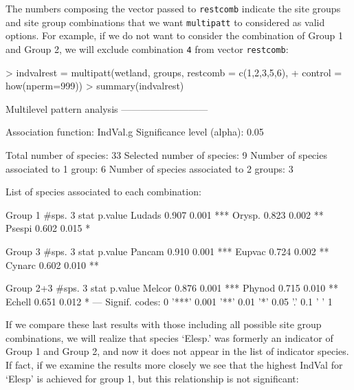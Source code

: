 \documentclass[11pt,a4paper]{article}
\begin{document}
The numbers composing the vector passed to \texttt{restcomb} indicate the site groups and site group combinations that we want \texttt{multipatt} to considered as valid options. For example, if we do not want to consider the combination of Group 1 and Group 2, we will exclude combination \texttt{4} from vector \texttt{restcomb}:
\begin{Schunk}
\begin{Sinput}
> indvalrest = multipatt(wetland, groups, restcomb = c(1,2,3,5,6), 
+                        control = how(nperm=999)) 
> summary(indvalrest)
\end{Sinput}
\begin{Soutput}
 Multilevel pattern analysis
 ---------------------------

 Association function: IndVal.g
 Significance level (alpha): 0.05

 Total number of species: 33
 Selected number of species: 9 
 Number of species associated to 1 group: 6 
 Number of species associated to 2 groups: 3 

 List of species associated to each combination: 

 Group 1  #sps.  3 
        stat p.value    
Ludads 0.907   0.001 ***
Orysp. 0.823   0.002 ** 
Psespi 0.602   0.015 *  

 Group 3  #sps.  3 
        stat p.value    
Pancam 0.910   0.001 ***
Eupvac 0.724   0.002 ** 
Cynarc 0.602   0.010 ** 

 Group 2+3  #sps.  3 
        stat p.value    
Melcor 0.876   0.001 ***
Phynod 0.715   0.010 ** 
Echell 0.651   0.012 *  
---
Signif. codes:  0 '***' 0.001 '**' 0.01 '*' 0.05 '.' 0.1 ' ' 1 
\end{Soutput}
\end{Schunk}
If we compare these last results with those including all possible site group combinations, we will realize that species `Elesp.' was formerly an indicator of Group 1 and Group 2, and now it does not appear in the list of indicator species. If fact, if we examine the results more closely we see that the highest IndVal for `Elesp' is achieved for group 1, but this relationship is not significant:
\end{document}

